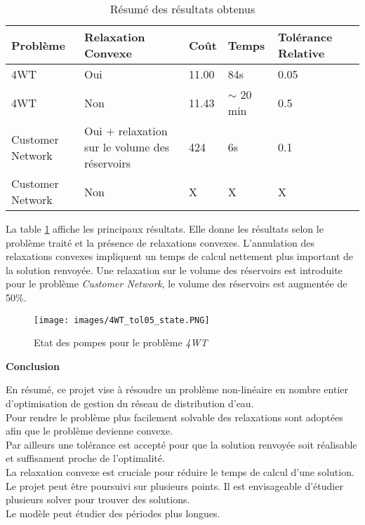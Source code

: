 \documentclass{article}
\begin{document}
\renewcommand{\arraystretch}{1.5}
\begin{table}[!h]
    \centering
    \begin{tabular}{|p{2.5cm}|p{2.5cm}|p{2.5cm}|p{2.5cm}|p{2.5cm}|p{2.5cm}|}
        \hline
        Problème    &   Relaxation Convexe    &   Coût    &   Temps   &   Tolérance Relative \\
        \hline
        4WT    &   Oui    &   11.00    &   84s   &   0.05 \\
        \hline
        4WT    &   Non    &   11.43    &   $\sim$ 20 min   &   0.5 \\
        \hline
        Customer Network    & \small  Oui + relaxation sur le volume des réservoirs    &   424    &   6s   &   0.1 \\
        \hline
        Customer Network    &   Non    &   X    &   X   &   X \\
        \hline
    \end{tabular}
    \caption{Résumé des résultats obtenus}
    \label{tab:resume}
\end{table}
\begin{multicols}{2}
    La table \ref{tab:resume} affiche les principaux résultats. Elle donne les résultats selon le problème traité et la présence de relaxations convexes. L'annulation des relaxations convexes impliquent un temps de calcul nettement plus important de la solution renvoyée. Une relaxation sur le volume des réservoirs est introduite pour le problème \textit{Customer Network}, le volume des réservoirs est augmentée de 50\%.
\end{multicols}

\begin{figure}[!t]
    \centering
    \texttt{[image: images/4WT\_tol05\_state.PNG]}
    \caption{Etat des pompes pour le problème \textit{4WT}}
\end{figure}

\clearpage

\textbf{Conclusion}\\
\begin{multicols}{2}
En résumé, ce projet vise à résoudre un problème non-linéaire en nombre entier d'optimisation de gestion du réseau de distribution d'eau.\\
Pour rendre le problème plus facilement solvable des relaxations sont adoptées afin que le problème devienne convexe.\\
Par ailleurs une tolérance est accepté pour que la solution renvoyée soit réalisable et suffisament proche de l'optimalité.\\
La relaxation convexe est cruciale pour réduire le temps de calcul d'une solution.
Le projet peut être poursuivi sur plusieurs points. Il est envisageable d'étudier plusieurs solver pour trouver des solutions.\\
Le modèle peut étudier des périodes plus longues.
\columnbreak
\vfill{~}
\end{multicols}
\end{document}
